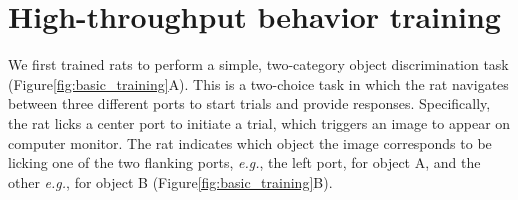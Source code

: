 \section{High-throughput behavior training}
We first trained rats to perform a simple, two-category object discrimination task\cite{Zoccolan2009} (Figure\ref{fig:basic_training}A). This is a two-choice task in which the rat navigates between three different ports to start trials and provide responses. Specifically, the rat licks a center port to initiate a trial, which triggers an image to appear on computer monitor. The rat indicates which object the image corresponds to be licking one of the two flanking ports, \textit{e.g.}, the left port, for object A, and the other \textit{e.g.}, for object B (Figure\ref{fig:basic_training}B).

